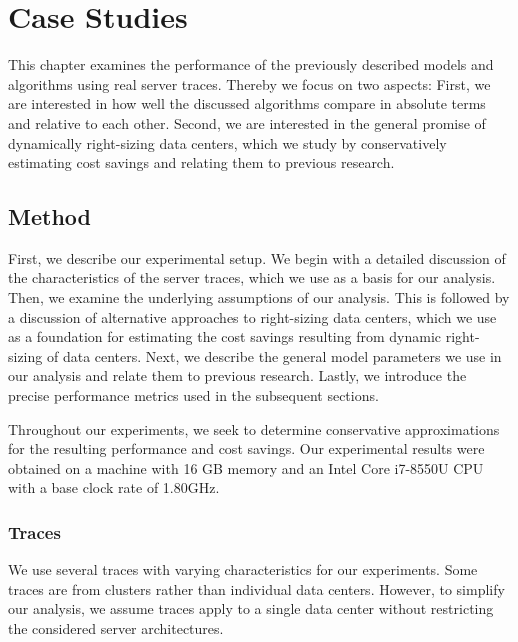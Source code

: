 
\chapter{Case Studies}\label{chapter:case_studies}

This chapter examines the performance of the previously described models and algorithms using real server traces. Thereby we focus on two aspects: First, we are interested in how well the discussed algorithms compare in absolute terms and relative to each other. Second, we are interested in the general promise of dynamically right-sizing data centers, which we study by conservatively estimating cost savings and relating them to previous research.

\section{Method}

First, we describe our experimental setup. We begin with a detailed discussion of the characteristics of the server traces, which we use as a basis for our analysis. Then, we examine the underlying assumptions of our analysis. This is followed by a discussion of alternative approaches to right-sizing data centers, which we use as a foundation for estimating the cost savings resulting from dynamic right-sizing of data centers. Next, we describe the general model parameters we use in our analysis and relate them to previous research. Lastly, we introduce the precise performance metrics used in the subsequent sections.

Throughout our experiments, we seek to determine conservative approximations for the resulting performance and cost savings. Our experimental results were obtained on a machine with 16 GB memory and an Intel Core i7-8550U CPU with a base clock rate of 1.80GHz.

\subsection{Traces}\label{section:case_studies:method:traces}

We use several traces with varying characteristics for our experiments. Some traces are from clusters rather than individual data centers. However, to simplify our analysis, we assume traces apply to a single data center without restricting the considered server architectures.

